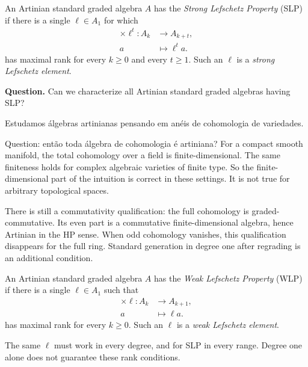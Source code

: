 \begin{definition}
\label{definition-slp}
An Artinian standard graded algebra $A$
has the \emph{Strong Lefschetz Property}
(SLP) if there is a single
$\ell\in A_1$ for which
$$
\begin{aligned}
\times\ell^t:A_k&\longrightarrow A_{k+t},\\
a&\longmapsto \ell^t a.
\end{aligned}
$$
has maximal rank for every $k\geq0$ and
every $t\geq1$.
Such an $\ell$ is a \emph{strong Lefschetz
element}.
\end{definition}

\medskip\noindent
\textbf{Question.}
Can we characterize all Artinian standard
graded algebras having SLP?

\begin{remark}
\label{remark-why-artinian}
Estudamos álgebras artinianas pensando
em anéis de cohomologia de variedades.

Question: então toda álgebra de
cohomologia é artiniana?
For a compact smooth manifold, the total
cohomology over a field is
finite-dimensional.
The same finiteness holds for complex
algebraic varieties of finite type.
So the finite-dimensional part of the
intuition is correct in these settings.
It is not true for arbitrary topological
spaces.

There is still a commutativity qualification:
the full cohomology is graded-commutative.
Its even part is a commutative
finite-dimensional algebra, hence Artinian
in the HP sense.
When odd cohomology vanishes, this
qualification disappears for the full ring.
Standard generation in degree one after
regrading is an additional condition.
\end{remark}

\begin{definition}
\label{definition-wlp}
An Artinian standard graded algebra $A$
has the \emph{Weak Lefschetz Property}
(WLP) if there is a single
$\ell\in A_1$ such that
$$
\begin{aligned}
\times\ell:A_k&\longrightarrow A_{k+1},\\
a&\longmapsto \ell a.
\end{aligned}
$$
has maximal rank for every $k\geq0$.
Such an $\ell$ is a \emph{weak Lefschetz
element}.
\end{definition}

The same $\ell$ must work in every
degree, and for SLP in every range.
Degree one alone does not guarantee
these rank conditions.

